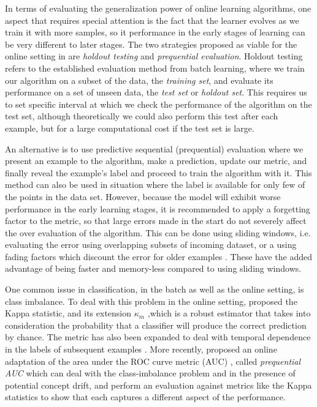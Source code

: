In terms of evaluating the generalization power of online learning
algorithms, one aspect that requires special attention is the fact
that the learner evolves as we train it with more samples, so it
performance in the early stages of learning can be very different
to later stages. The two strategies proposed as viable for the online
setting in \cite{online-evaluation-journal} are \emph{holdout testing}
and \emph{prequential evaluation}. Holdout testing refers to the
established evaluation method from batch learning, where we train
our algorithm on a subset of the data, the \emph{training set},
and evaluate its performance on a set of unseen data, the
\emph{test set} or \emph{holdout set}. This requires us to set
specific interval at which we check the performance of the algorithm
on the test set, although theoretically we could also perform this
test after each example, but for a large computational cost if
the test set is large.

An alternative is to use
predictive sequential (prequential) evaluation where we present
an example to the algorithm, make a prediction, update our metric,
and finally reveal the example's label and proceed to train the
algorithm with it. This method can also be used in situation
where the label is available for only few of the points in the
data set. However, because the model will exhibit worse performance
in the early learning stages, it is recommended to apply a forgetting
factor to the metric, so that large errors made in the start do
not severely affect the over evaluation of the algorithm. This
can be done using sliding windows, i.e. evaluating the error using
overlapping subsets of incoming dataset, or a using fading
factors which discount the error for older examples \cite{online-evaluation-kdd}.
These have the added advantage of being faster and memory-less
compared to using sliding windows.

One common issue in classification, in the batch as well as the online setting, is class
imbalance. To deal with this problem in the online setting, \citet{kappa-statistic}
proposed the Kappa statistic, and its extension $\kappa_m$ \cite{kappa-m},which is a robust estimator that takes into consideration
the probability that a classifier will produce the correct prediction by chance.
The metric has also been expanded to deal with temporal dependence
in the labels of subsequent examples \cite{temporal-dependence}.
More recently, \citet{prequential-auc} proposed an online adaptation
of the area under the ROC curve metric (AUC) \cite{auc}, called
\emph{prequential AUC} which can deal with the class-imbalance
problem and in the presence of potential concept drift, and perform
an evaluation against metrics like the Kappa statistics to show
that each captures a different aspect of the performance.

